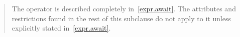 \begin{quote}
\setcounter{Paras}{5}
\pnum
The 
 operator
is described completely in~\ref{expr.await}.
The attributes and restrictions
found in the rest of this subclause do not apply to it unless explicitly
stated in~\ref{expr.await}.
\end{quote}

%
%
%
%

%


